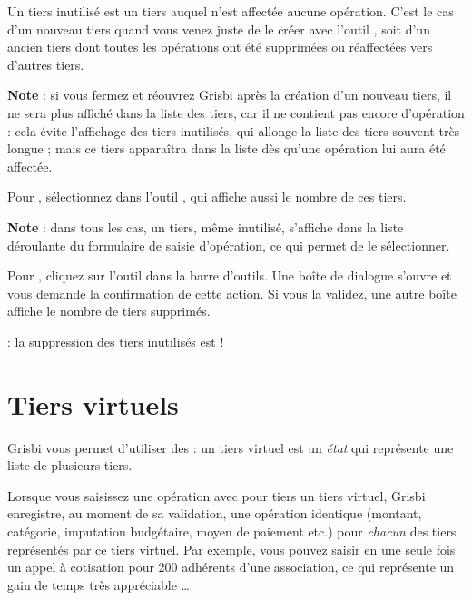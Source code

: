 Un tiers inutilisé est un tiers auquel n'est affectée aucune opération. C'est le cas d'un nouveau tiers quand vous venez juste de le créer avec l'outil , soit d'un ancien tiers dont toutes les opérations ont été supprimées ou réaffectées vers d'autres tiers.

\textbf{Note} : si vous fermez et réouvrez Grisbi après la création d'un nouveau tiers, il ne sera plus affiché dans la liste des tiers, car il ne contient pas encore d'opération : cela évite l'affichage des tiers inutilisés, qui allonge la liste des tiers souvent très longue ; mais ce tiers apparaîtra dans la liste dès qu'une opération lui aura été affectée.

Pour , sélectionnez  dans l'outil , qui affiche aussi le nombre de ces tiers.

\textbf{Note} : dans tous les cas, un tiers, même inutilisé, s'affiche dans la liste déroulante du formulaire de saisie d'opération, ce qui permet de le sélectionner.

Pour , cliquez sur l'outil  dans la barre d'outils. Une  boîte de dialogue s'ouvre et vous demande la confirmation de cette action. Si vous la validez, une autre boîte affiche le nombre de tiers supprimés.

 : la suppression des tiers inutilisés est  !

\ifIllustration
\newpage
\fi


\section{Tiers virtuels\label{thirdparties-virtualCreate}}


Grisbi vous permet d'utiliser des  : un tiers virtuel est un \emph{état} qui représente une liste de plusieurs tiers.

Lorsque vous saisissez une opération avec pour tiers un tiers virtuel, Grisbi enregistre, au moment de sa validation, une opération identique (montant, catégorie, imputation budgétaire, moyen de paiement etc.) pour \emph{chacun} des tiers représentés par ce tiers virtuel. Par exemple, vous pouvez saisir en une seule fois un appel à cotisation pour 200 adhérents d'une association, ce qui représente un gain de temps très appréciable \ldots

